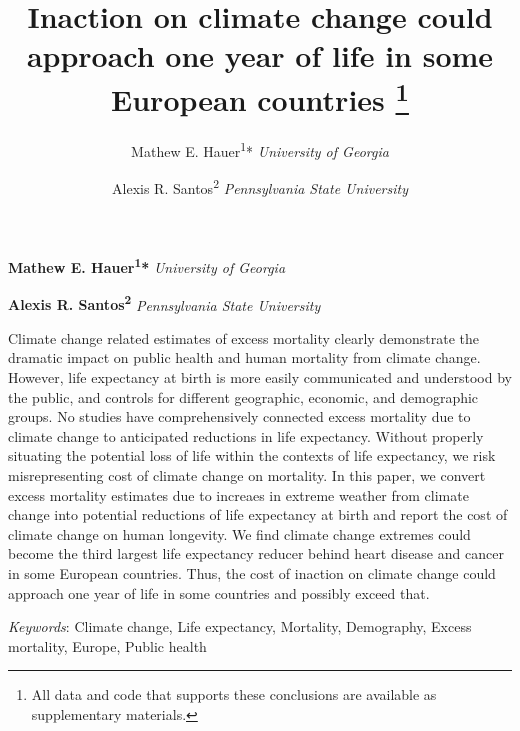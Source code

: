 \documentclass[12pt,]{article}
\title{Inaction on climate change could approach one year of life in some
European countries \thanks{All data and code that supports these conclusions are available as
supplementary materials.}  }
\author{\Large Mathew E. Hauer\textsuperscript{1}*\vspace{0.05in} \newline\normalsize\emph{University of Georgia}   \and \Large Alexis R. Santos\textsuperscript{2}\vspace{0.05in} \newline\normalsize\emph{Pennsylvania State University}  }
\date{}
\newcommand*{\authorfont}{\fontfamily{phv}\selectfont}
\renewenvironment{abstract}
 {{%
    \setlength{\leftmargin}{0mm}
    \setlength{\rightmargin}{\leftmargin}%
  }%
  \relax}
 {\endlist}
\begin{document}
	
%

{%
\setlength{\parindent}{0pt}
\thispagestyle{plain}
{\fontsize{18}{20}\selectfont\raggedright 
\maketitle  %

}

{
   \vskip 13.5pt\relax \normalsize\fontsize{11}{12} 
\textbf{\authorfont Mathew E. Hauer\textsuperscript{1}*} \hskip 15pt \emph{\small University of Georgia}   \par \textbf{\authorfont Alexis R. Santos\textsuperscript{2}} \hskip 15pt \emph{\small Pennsylvania State University}   

}

}








\begin{abstract}

    \hbox{\vrule height .2pt width 39.14pc}

    \vskip 8.5pt %

\noindent Climate change related estimates of excess mortality clearly demonstrate
the dramatic impact on public health and human mortality from climate
change. However, life expectancy at birth is more easily communicated
and understood by the public, and controls for different geographic,
economic, and demographic groups. No studies have comprehensively
connected excess mortality due to climate change to anticipated
reductions in life expectancy. Without properly situating the potential
loss of life within the contexts of life expectancy, we risk
misrepresenting cost of climate change on mortality. In this paper, we
convert excess mortality estimates due to increaes in extreme weather
from climate change into potential reductions of life expectancy at
birth and report the cost of climate change on human longevity. We find
climate change extremes could become the third largest life expectancy
reducer behind heart disease and cancer in some European countries.
Thus, the cost of inaction on climate change could approach one year of
life in some countries and possibly exceed that.


\vskip 8.5pt \noindent \emph{Keywords}: Climate change, Life expectancy, Mortality, Demography, Excess
mortality, Europe, Public health \par

    \hbox{\vrule height .2pt width 39.14pc}



\end{abstract}
\end{document}
